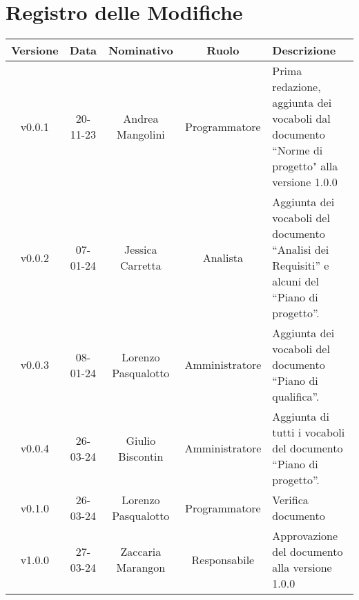 \section*{\Large Registro delle Modifiche}
    \begin{table}[h]
        \centering
        \renewcommand\tabularxcolumn[1]{m{#1}} %
        \renewcommand{\arraystretch}{1.5}
        \begin{tabularx}{0.98\textwidth}
            {c|c|c|c|>{\centering\arraybackslash}X}
            \rowcolor{black}
            \textbf{\color{white} Versione} & \textbf{\color{white} Data} & \textbf{\color{white} Nominativo} & \textbf{\color{white} Ruolo} & \textbf{\color{white} Descrizione} \\ 
            \hline

            v0.0.1 & 20-11-23 & Andrea Mangolini & Programmatore & Prima redazione, aggiunta dei vocaboli dal documento ``Norme di progetto" alla versione 1.0.0 \\
            v0.0.2 & 07-01-24 & Jessica Carretta & Analista & Aggiunta dei vocaboli del documento ``Analisi dei Requisiti'' e alcuni del ``Piano di progetto''. \\
            v0.0.3 & 08-01-24 & Lorenzo Pasqualotto & Amministratore & Aggiunta dei vocaboli del documento ``Piano di qualifica''. \\
            v0.0.4 & 26-03-24 & Giulio Biscontin & Amministratore & Aggiunta di tutti i vocaboli del documento ``Piano di progetto''. \\
            v0.1.0 & 26-03-24 & Lorenzo Pasqualotto & Programmatore & Verifica documento \\
            v1.0.0 & 27-03-24 & Zaccaria Marangon & Responsabile & Approvazione del documento alla versione 1.0.0 \\
            \hline
        \end{tabularx}
    \end{table}